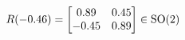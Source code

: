 \documentclass[preview]{standalone}
\begin{document}
\begin{align*}
\special{dvisvgm:raw <g id='unique000'>}R(-0.46) = \begin{bmatrix} 0.89 & 0.45 \\ -0.45 & 0.89 \end{bmatrix} \in \text{SO}(2)\special{dvisvgm:raw </g>}
\end{align*}
\end{document}
